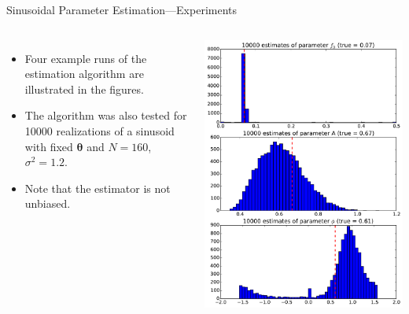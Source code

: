 \documentclass[10pt, aspectratio=169]{beamer} %
\newcommand{\thb}{\boldsymbol{\theta}}
\begin{document}
\begin{frame}{Sinusoidal Parameter Estimation---Experiments}
\begin{columns}
\begin{itemize}
\item Four example runs of the estimation algorithm are illustrated in the figures.
\item The algorithm was also tested for 10000 realizations of a sinusoid with
fixed $\thb$ and $N=160$, $\sigma^2=1.2$.
\item Note that the estimator is not unbiased.
\end{itemize}
\centerline{\includegraphics[width=\textwidth]{ML_sinusoid_batch.pdf}}
\end{columns}
\end{frame}
\end{document}
